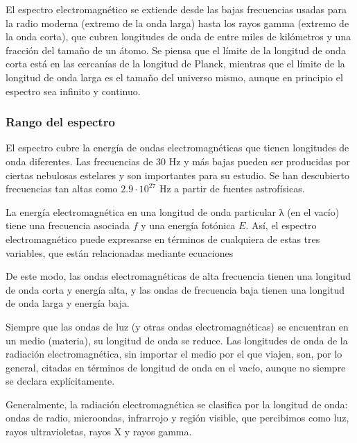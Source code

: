\documentclass[12pt]{article}
\begin{document}
El espectro electromagn\'etico se extiende desde las bajas frecuencias usadas para la radio moderna (extremo de la onda larga) hasta los rayos gamma (extremo de la onda corta), que cubren longitudes de onda de entre miles de kil\'ometros y una fracci\'on del tama\~no de un \'atomo. Se piensa que el l\'imite de la longitud de onda corta est\'a en las cercan\'ias de la longitud de Planck, mientras que el l\'imite de la longitud de onda larga es el tama\~no del universo mismo, aunque en principio el espectro sea infinito y continuo.

\subsubsection{Rango del espectro}
El espectro cubre la energ\'ia de ondas electromagn\'eticas que tienen longitudes de onda diferentes. Las frecuencias de 30 Hz y m\'as bajas pueden ser producidas por ciertas nebulosas estelares y son importantes para su estudio. Se han descubierto frecuencias tan altas como $2.9\cdot 10^{27}$ Hz a partir de fuentes astrof\'isicas.
\vspace{0.4cm}

La energ\'ia electromagn\'etica en una longitud de onda particular λ (en el vac\'io) tiene una frecuencia asociada $f$ y una energ\'ia fot\'onica $E$. As\'i, el espectro electromagn\'etico puede expresarse en t\'erminos de cualquiera de estas tres variables, que est\'an relacionadas mediante ecuaciones
\vspace{0.4cm}

De este modo, las ondas electromagn\'eticas de alta frecuencia tienen una longitud de onda corta y energ\'ia alta, y las ondas de frecuencia baja tienen una longitud de onda larga y energ\'ia baja.
\vspace{0.4cm}

Siempre que las ondas de luz (y otras ondas electromagn\'eticas) se encuentran en un medio (materia), su longitud de onda se reduce. Las longitudes de onda de la radiaci\'on electromagn\'etica, sin importar el medio por el que viajen, son, por lo general, citadas en t\'erminos de longitud de onda en el vac\'io, aunque no siempre se declara expl\'icitamente.
\vspace{0.4cm}

Generalmente, la radiaci\'on electromagn\'etica se clasifica por la longitud de onda: ondas de radio, microondas, infrarrojo y regi\'on visible, que percibimos como luz, rayos ultravioletas, rayos X y rayos gamma.
\end{document}
